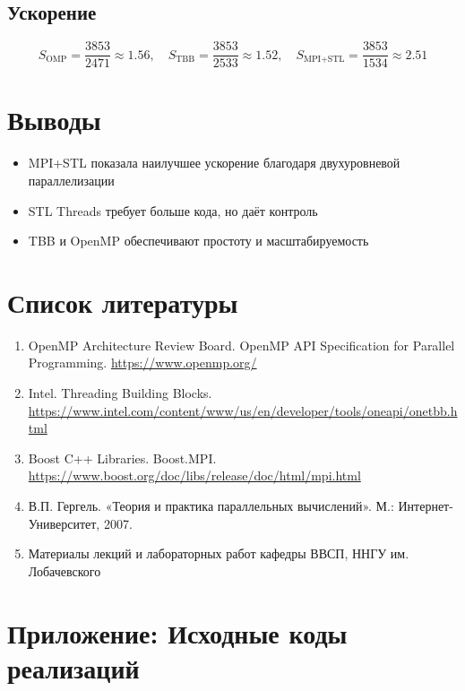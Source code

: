 \documentclass[12pt]{article}
\begin{document}
\subsection*{Ускорение}
\[
S_{\text{OMP}} = \frac{3853}{2471} \approx 1.56, \quad
S_{\text{TBB}} = \frac{3853}{2533} \approx 1.52, \quad
S_{\text{MPI+STL}} = \frac{3853}{1534} \approx 2.51
\]

\section{Выводы}
\begin{itemize}
  \item MPI+STL показала наилучшее ускорение благодаря двухуровневой параллелизации
  \item STL Threads требует больше кода, но даёт контроль
  \item TBB и OpenMP обеспечивают простоту и масштабируемость
\end{itemize}

\section*{Список литературы}
\begin{enumerate}
  \item OpenMP Architecture Review Board. OpenMP API Specification for Parallel Programming. \url{https://www.openmp.org/}
  \item Intel. Threading Building Blocks. \url{https://www.intel.com/content/www/us/en/developer/tools/oneapi/onetbb.html}
  \item Boost C++ Libraries. Boost.MPI. \url{https://www.boost.org/doc/libs/release/doc/html/mpi.html}
  \item В.П. Гергель. «Теория и практика параллельных вычислений». М.: Интернет-Университет, 2007.
  \item Материалы лекций и лабораторных работ кафедры ВВСП, ННГУ им. Лобачевского
\end{enumerate}

\newpage
\appendix
\section*{Приложение: Исходные коды реализаций}
\end{document}
